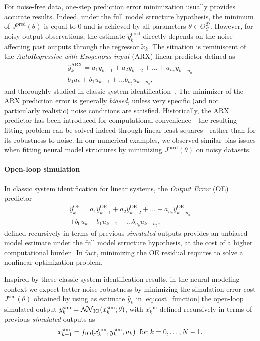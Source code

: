 \documentclass{article}
\newcommand{\So}{{S}}            %
\newcommand{\NN}{\mathcal{N\!N}} %
\newcommand{\nsamp}{N}
\newcommand{\Did}{{\mathcal{D}}}
\begin{document}
For noise-free data,  one-step prediction error minimization   usually provides accurate results. Indeed, under the full model structure hypothesis, the minimum  of $J^{\mathrm{pred}}(\theta)$ is equal to $0$ and is achieved by all   parameters  $\theta \in \Theta_\So^{\Did}$.    
However, for noisy output observations,  the estimate $\hat y_{k}^{\mathrm{pred}}$   directly depends on  the noise affecting past outputs through the regressor $\tilde x_k$.   
The situation is reminiscent of the \emph{AutoRegressive with Exogenous input} (ARX)  linear predictor defined as
\begin{multline}
 \label{eq:ARX}
 \hat y_{k}^{\mathrm{ARX}} = a_1  y_{k-1} + a_2   y_{k-2} + \dots + a_{n_a}   y_{k-n_a}\\ 
 b_0 u_k+ b_1 u_{k-1}  + \dots b_{n_b} u_{k-n_b}, 
\end{multline}
and thoroughly studied in classic system identification~\citep{ljung:1999system}.
The minimizer of the ARX prediction error is generally \emph{biased}, unless very specific (and not particularly realistic) noise conditions are satisfied. Historically, the ARX predictor has been introduced for computational convenience---the resulting fitting problem can be solved indeed through linear least squares---rather than for its robustness to noise. 
In our numerical examples, we observed similar bias issues  when fitting neural model structures by minimizing $J^\mathrm{pred}(\theta)$ on noisy datasets.

\paragraph{Open-loop simulation}
In classic system identification for linear systems, the \emph{Output Error} (OE) predictor 
\begin{multline}
 \label{eq:OE}
 \hat y_{k}^{\mathrm{OE}} = a_1\hat y_{k-1}^{\mathrm{OE}} + a_2 \hat y_{k-2}^{\mathrm{OE}} + \dots + a_{n_a} \hat y_{k-n_a}^{\mathrm{OE}}\\ 
 + b_0 u_{k} + b_1 u_{k-1} + \dots b_{n_b} u_{k-n_b}, 
\end{multline}
defined recursively in terms of previous \emph{simulated} outputs provides an unbiased model estimate under the full model structure hypothesis, at the cost of a higher computational burden. In fact, minimizing the OE residual requires to solve a nonlinear optimization problem.
 
Inspired by these classic system identification results, in the neural modeling context 
we expect better noise robustness by minimizing the simulation error cost $J^{\mathrm{sim}}(\theta)$ obtained by using as estimate $\hat y_k$ in \eqref{eq:cost_function} the open-loop simulated output $y_k^{\mathrm{sim}}  = \NN_{\rm IO}(x_k^{\mathrm{sim}};\theta)$, with $x_{k}^{\mathrm{sim}}$ defined recursively in terms of previous \emph{simulated} outputs as
\begin{equation} 
		x_{k+1}^{\mathrm{sim}} = f_{\rm IO}(x_{k}^{\mathrm{sim}}, y_k^{\mathrm{sim}}, u_k) \;\; \text{for }k=0,\dots, \nsamp -1.  
\end{equation}
\end{document}
